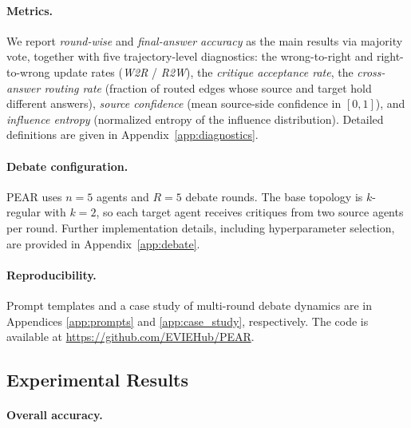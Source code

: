 \paragraph{Metrics.}
We report \textit{round-wise} and \textit{final-answer accuracy} as the main results via majority vote, together with five trajectory-level diagnostics: the wrong-to-right and right-to-wrong update rates (\textit{W2R} / \textit{R2W}), the \textit{critique acceptance rate}, the \textit{cross-answer routing rate} (fraction of routed edges whose source and target hold different answers), \textit{source confidence} (mean source-side confidence in $[0,1]$), and \textit{influence entropy} (normalized entropy of the influence distribution). Detailed definitions are given in Appendix~\ref{app:diagnostics}.


\paragraph{Debate configuration.}
PEAR uses $n=5$ agents and $R=5$ debate rounds. The base topology is $k$-regular with $k=2$, so each target agent receives critiques from two source agents per round.
Further implementation details, including hyperparameter selection, are provided in Appendix~\ref{app:debate}.

\paragraph{Reproducibility.} %
Prompt templates and a case study of multi-round debate dynamics are in Appendices \ref{app:prompts} and \ref{app:case_study}, respectively. 
The code is available at \url{https://github.com/EVIEHub/PEAR}.



\subsection{Experimental Results}

\paragraph{Overall accuracy.}

